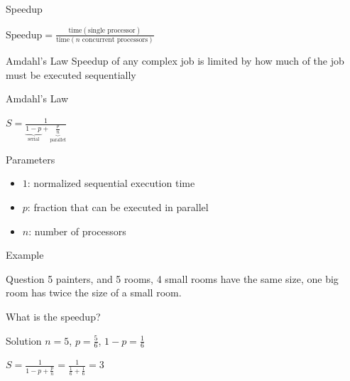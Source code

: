 \begin{frame}{Speedup}
  \begin{center}
    \huge
    \begin{math}
      \text{Speedup} = \frac{\text{time}(\text{single
          processor})}{\text{time}(n \text{ concurrent processors})}
    \end{math}    
  \end{center}


  \begin{block}{Amdahl's Law}
    Speedup of any complex job is limited by how much of the job must
    be executed sequentially    
  \end{block}
\end{frame}

\begin{frame}{Amdahl's Law}
  \begin{center}
    \huge
    \begin{math}
      S = \frac{1}{\underbrace{1 - p}_{\text{serial}} + \underbrace{\frac{p}{n}}_{\text{parallel}}}
    \end{math}
  \end{center}


  Parameters

  \begin{itemize}
  \item $1$: normalized sequential execution time
  \item $p$: fraction that can be executed in parallel
  \item $n$: number of processors
  \end{itemize}
\end{frame}

\begin{frame}{Example}
  \begin{block}{Question}
    5 painters, and 5 rooms, 4 small rooms have the same size, one big
    room has twice the size of a small room.

    What is the speedup?
  \end{block}


  \pause

  \begin{exampleblock}{Solution}
    $n = 5$, $p = \frac{5}{6}$, $1 - p = \frac{1}{6}$
    \begin{center}
      \huge
      \begin{math}
        S = \frac{1}{1 - p + \frac{p}{n}} = \frac{1}{\frac{1}{6} +
          \frac{1}{6}} = 3
      \end{math}
    \end{center}
  \end{exampleblock}
\end{frame}

